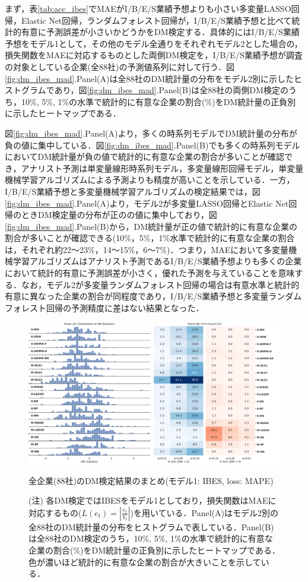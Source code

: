 \documentclass[a4paper，12pt]{jsarticle}
\begin{document}
まず，表\ref{tab:acc_ibes}でMAEがI/B/E/S業績予想よりも小さい多変量LASSO回帰，Elastic Net回帰，ランダムフォレスト回帰が，I/B/E/S業績予想と比べて統計的有意に予測誤差が小さいかどうかをDM検定する．具体的にはI/B/E/S業績予想をモデル1として，その他のモデル全通りをそれぞれモデル2とした場合の，損失関数をMAEに対応するものとした両側DM検定を，I/B/E/S業績予想が調査の対象としている企業(全88社)の予測値系列に対して行う．図\ref{fig:dm_ibes_mad}.Panel(A)は全88社のDM統計量の分布をモデル2別に示したヒストグラムであり，図\ref{fig:dm_ibes_mad}.Panel(B)は全88社の両側DM検定のうち，10\%, 5\%, 1\%の水準で統計的に有意な企業の割合(\%)をDM統計量の正負別に示したヒートマップである．

図\ref{fig:dm_ibes_mad}.Panel(A)より，多くの時系列モデルでDM統計量の分布が負の値に集中している．図\ref{fig:dm_ibes_mad}.Panel(B)でも多くの時系列モデルにおいてDM統計量が負の値で統計的に有意な企業の割合が多いことが確認でき，アナリスト予測は単変量線形時系列モデル，多変量線形回帰モデル，単変量機械学習アルゴリズムによる予測よりも精度が高いことを示している．一方，I/B/E/S業績予想と多変量機械学習アルゴリズムの検定結果では，図\ref{fig:dm_ibes_mad}.Panel(A)より，モデル2が多変量LASSO回帰とElastic Net回帰のときDM検定量の分布が正のの値に集中しており，図\ref{fig:dm_ibes_mad}.Panel(B)から，DM統計量が正の値で統計的に有意な企業の割合が多いことが確認できる(10\%，5\%，1\%水準で統計的に有意な企業の割合は，それぞれ約22～23\%，14～15\%，6～7\%)．つまり，MAEにおいて多変量機械学習アルゴリズムはアナリスト予測であるI/B/E/S業績予想よりも多くの企業において統計的有意に予測誤差が小さく，優れた予測を与えていることを意味する．なお，モデル2が多変量ランダムフォレスト回帰の場合は有意水準と統計的有意に異なった企業の割合が同程度であり，I/B/E/S業績予想と多変量ランダムフォレスト回帰の予測精度に差はない結果となった．

\begin{figure}[htbp]
  \centering
  \includegraphics[width=15cm]{./img/_dm_MAPE_y_hat_ibes.pdf}
  \caption{全企業(88社)のDM検定結果のまとめ(モデル1: IBES, loss: MAPE)}
  \label{fig:dm_ibes_mape}
  \caption*{(注) 各DM検定ではIBESをモデル1としており，損失関数はMAEに対応するもの($L(e_t)=\left|\frac{e_t}{Y_t}\right|$)を用いている．Panel(A)はモデル2別の全88社のDM統計量の分布をヒストグラムで表している．Panel(B)は全88社のDM検定のうち，10\%, 5\%, 1\%の水準で統計的に有意な企業の割合(\%)をDM統計量の正負別に示したヒートマップである．色が濃いほど統計的に有意な企業の割合が大きいことを示している．}
\end{figure}
\end{document}
